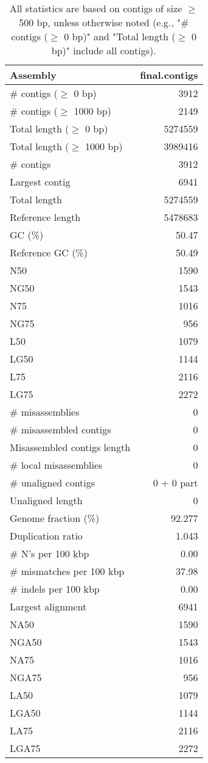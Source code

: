 \documentclass[12pt,a4paper]{article}
\begin{document}
\begin{table}[ht]
\begin{center}
\caption{All statistics are based on contigs of size $\geq$ 500 bp, unless otherwise noted (e.g., "\# contigs ($\geq$ 0 bp)" and "Total length ($\geq$ 0 bp)" include all contigs).}
\begin{tabular}{|l*{1}{|r}|}
\hline
Assembly & final.contigs \\ \hline
\# contigs ($\geq$ 0 bp) & 3912 \\ \hline
\# contigs ($\geq$ 1000 bp) & 2149 \\ \hline
Total length ($\geq$ 0 bp) & 5274559 \\ \hline
Total length ($\geq$ 1000 bp) & 3989416 \\ \hline
\# contigs & 3912 \\ \hline
Largest contig & 6941 \\ \hline
Total length & 5274559 \\ \hline
Reference length & 5478683 \\ \hline
GC (\%) & 50.47 \\ \hline
Reference GC (\%) & 50.49 \\ \hline
N50 & 1590 \\ \hline
NG50 & 1543 \\ \hline
N75 & 1016 \\ \hline
NG75 & 956 \\ \hline
L50 & 1079 \\ \hline
LG50 & 1144 \\ \hline
L75 & 2116 \\ \hline
LG75 & 2272 \\ \hline
\# misassemblies & 0 \\ \hline
\# misassembled contigs & 0 \\ \hline
Misassembled contigs length & 0 \\ \hline
\# local misassemblies & 0 \\ \hline
\# unaligned contigs & 0 + 0 part \\ \hline
Unaligned length & 0 \\ \hline
Genome fraction (\%) & 92.277 \\ \hline
Duplication ratio & 1.043 \\ \hline
\# N's per 100 kbp & 0.00 \\ \hline
\# mismatches per 100 kbp & 37.98 \\ \hline
\# indels per 100 kbp & 0.00 \\ \hline
Largest alignment & 6941 \\ \hline
NA50 & 1590 \\ \hline
NGA50 & 1543 \\ \hline
NA75 & 1016 \\ \hline
NGA75 & 956 \\ \hline
LA50 & 1079 \\ \hline
LGA50 & 1144 \\ \hline
LA75 & 2116 \\ \hline
LGA75 & 2272 \\ \hline
\end{tabular}
\end{center}
\end{table}
\end{document}
